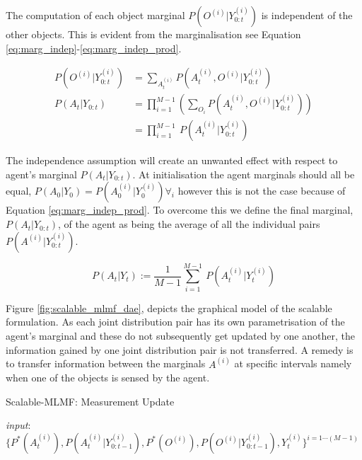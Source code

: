 \documentclass[review]{elsarticle}
\numberwithin{equation}{section}
\begin{document}
The computation of each object marginal $P(O^{(i)}|Y^{(i)}_{0:t})$ is independent of the other objects. This is evident from the marginalisation 
see Equation \ref{eq:marg_indep}-\ref{eq:marg_indep_prod}.

\begin{align}
 P(O^{(i)}|Y^{(i)}_{0:t}) &= \sum\limits_{A^{(i)}_t} P(A^{(i)}_t,O^{(i)}|Y^{(i)}_{0:t}) \label{eq:marg_indep} \\
 P(A_t|Y_{0:t})   &= \prod\limits_{i=1}^{M-1} \left(\sum\limits_{O_i} P(A^{(i)}_t,O^{(i)}|Y^{(i)}_{0:t})\right)  \\
	    &= \prod\limits_{i=1}^{M-1} \ P(A^{(i)}_t|Y^{(i)}_{0:t}) \label{eq:marg_indep_prod}
\end{align}

The independence assumption will create an unwanted effect with respect to agent's marginal $P(A_t|Y_{0:t})$. 
At initialisation the agent marginals should all be equal, $P(A_0|Y_0) = P(A^{(i)}_0|Y^{(i)}_0) \forall_i$ however this is not the case because of 
Equation \ref{eq:marg_indep_prod}. To overcome this we define the final marginal, $P(A_t|Y_{0:t})$, of the agent as being the average of all the individual
pairs $P(A^{(i)}|Y^{(i)}_{0:t})$.

\begin{equation}
  P(A_t|Y_t) := \frac{1}{M-1} \sum\limits_{i=1}^{M-1} \ P(A^{(i)}_t|Y^{(i)}_t) \label{eq:marg_indep_sum}
\end{equation}

Figure \ref{fig:scalable_mlmf_dae}, depicts the graphical model of the scalable formulation. 
As each joint distribution pair has its own parametrisation of the agent's marginal and these do not subsequently get updated by one another,
the information gained by one joint distribution pair is not transferred.
A remedy is to transfer information between the marginals $A^{(i)}$ at specific intervals namely when one of the objects is sensed by the agent. 


\begin{algorithm}
\caption{Scalable-MLMF: Measurement Update}
\textit{input}: $\{P^{*}(A^{(i)}_t),P(A^{(i)}_t|Y^{(i)}_{0:t-1}),P^{*}(O^{(i)}),P(O^{(i)}|Y^{(i)}_{0:t-1}),Y^{(i)}_t\}^{i=1\cdots (M-1)}$
  \begin{algorithmic}[1]
   
          
	 
      \EndFor 
\vspace{-1em}	\Else
  \EndIf
\end{algorithmic} \label{alg:scalabe-mrf-slam}
\end{algorithm}
\end{document}
